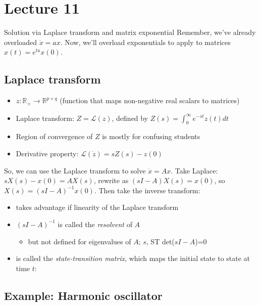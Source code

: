 \documentclass[10pt,letterpaper]{article}
\begin{document}
\section{Lecture 11}
\label{sec-9}

Solution via Laplace transform and matrix exponential
Remember, we've already overloaded $\dot x =ax$. Now, we'll overload exponentials to apply to matrices $x(t) = e ^{ta} x(0)$.
\subsection{Laplace transform}
\label{sec-9_1}

\begin{itemize}
\item $z: \mathbb{R} _{+} \rightarrow \mathbb{R}^{p\times q}$ (function that maps non-negative real scalars to matrices)
\item Laplace transform: $Z= \mathcal{L}(z)$, defined by $\displaystyle Z(s) = \int _{0} ^{\infty} e ^{-st} z(t) dt$
\item Region of convergence of $Z$ is mostly for confusing students
\item Derivative property: $\mathcal{L}(\dot z) = sZ(s)-z(0)$
\end{itemize}
So, we can use the Laplace transform to solve $\dot x=Ax$. Take Laplace: $sX(s)-x(0)=AX(s)$, rewrite as $(sI-A)X(s) = x(0)$, so $X(s) = (sI-A) ^{-1} x(0)$. Then take the inverse transform: 
\begin{itemize}
\item takes advantage if linearity of the Laplace transform
\item $(sI-A) ^{-1}$ is called the \emph{resolvent} of $A$

\begin{itemize}
\item but not defined for eigenvalues of $A$; $s$, ST det($sI-A$)=0
\end{itemize}

\item {} is called the \emph{state-transition matrix}, which maps the initial state to state at time $t$: 
\end{itemize}
\subsection{Example: Harmonic oscillator}
\label{sec-9_2}
\end{document}
